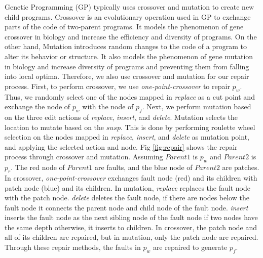 \documentclass[10pt,conference]{IEEEtran}
\begin{document}
        Genetic Programming (GP) typically uses crossover and mutation to create new child programs. Crossover is an evolutionary operation used in GP to exchange parts of the code of two-parent programs. It models the phenomenon of gene crossover in biology and increase the efficiency and diversity of programs. On the other hand, Mutation introduces random changes to the code of a program to alter its behavior or structure. It also models the phenomenon of gene mutation in biology and increase diversity of programs and preventing them from falling into local optima. Therefore, we also use crossover and mutation for our repair process. First, to perform crossover, we use \textit{one-point-crossover} to repair $p_{w}$. Thus, we randomly select one of the nodes mapped in \textit{replace} as a cut point and exchange the node of $p_{w}$ with the node of $p_{f}$. Next, we perform mutation based on the three edit actions of \textit{replace}, \textit{insert}, and \textit{delete}. Mutation selects the location to mutate based on the $susp$. This is done by performing roulette wheel selection \cite{eiben2015introduction} on the nodes mapped in \textit{replace}, \textit{insert}, and \textit{delete} as mutation point, and applying the selected action and node. Fig \ref{fig:repair} shows the repair process through crossover and mutation. Assuming $Parent1$ is $p_{w}$ and $Parent2$ is $p_{r}$. The red node of $Parent1$ are faults, and the blue node of $Parent2$ are patches. In crossover, \textit{one-point-crossover} exchanges fault node (red) and its children with patch node (blue) and its children. In mutation, \textit{replace} replaces the fault node with the patch node. \textit{delete} deletes the fault node, if there are nodes below the fault node it connects the parent node and child node of the fault node. \textit{insert} inserts the fault node as the next sibling node of the fault node if two nodes have the same depth otherwise, it inserts to children. In crossover, the patch node and all of its children are repaired, but in mutation, only the patch node are repaired. Through these repair methods, the faults in $p_{w}$ are repaired to generate $p_{f}$.
\end{document}
